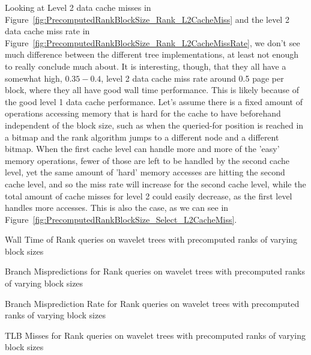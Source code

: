 Looking at Level 2 data cache misses in Figure~\ref{fig:PrecomputedRankBlockSize_Rank_L2CacheMiss} and the level 2 data cache miss rate in Figure~\ref{fig:PrecomputedRankBlockSize_Rank_L2CacheMissRate}, we don't see much difference between the different tree implementations, at least not enough to really conclude much about.
It is interesting, though, that they all have a somewhat high, $0.35-0.4$, level 2 data cache miss rate around 0.5 page per block, where they all have good wall time performance.
This is likely because of the good level 1 data cache performance.
Let's assume there is a fixed amount of operations accessing memory that is hard for the cache to have beforehand independent of the block size, such as when the queried-for position is reached in a bitmap and the rank algorithm jumps to a different node and a different bitmap.
When the first cache level can handle more and more of the 'easy' memory operations, fewer of those are left to be handled by the second cache level, yet the same amount of 'hard' memory accesses are hitting the second cache level, and so the miss rate will increase for the second cache level, while the total amount of cache misses for level 2 could easily decrease, as the first level handles more accesses.
This is also the case, as we can see in Figure~\ref{fig:PrecomputedRankBlockSize_Select_L2CacheMiss}.

\figureBegin
\caption{Wall Time of Rank queries on wavelet trees with precomputed ranks of varying block sizes}
\label{fig:PrecomputedRankBlockSize_Rank_WallTime}

\figureEnd


%

\figureBegin
\caption{Branch Mispredictions for Rank queries on wavelet trees with precomputed ranks of varying block sizes}
\label{fig:PrecomputedRankBlockSize_Rank_BranchMiss}

\figureEnd


\figureBegin
\caption{Branch Misprediction Rate for Rank queries on wavelet trees with precomputed ranks of varying block sizes}
\label{fig:PrecomputedRankBlockSize_Rank_BranchMissRate}

\figureEnd


\figureBegin
\caption{TLB Misses for Rank queries on wavelet trees with precomputed ranks of varying block sizes}
\label{fig:PrecomputedRankBlockSize_Rank_TLB}

\figureEnd


